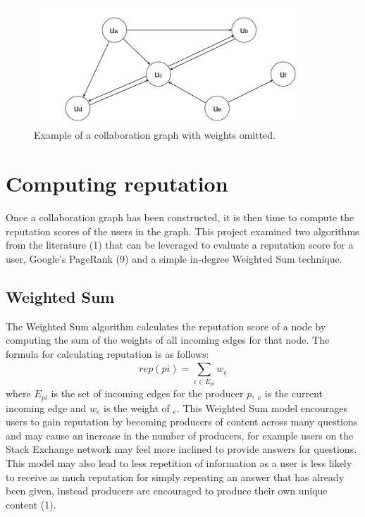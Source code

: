 \documentclass[]{final_report}
\begin{document}
\begin{figure}[ht!]
\centering
\includegraphics[width=100mm]{chap3/collabgraph.png}
\caption{Example of a collaboration graph with weights omitted.}
\label{gra:collabgraph}
\end{figure}

\section{Computing reputation}

Once a collaboration graph has been constructed, it is then time to compute the reputation scores of the users in the graph. This project examined two algorithms from the literature (1) that can be leveraged to evaluate a reputation score for a user, Google's PageRank (9) and a simple in-degree Weighted Sum technique.

\subsection{Weighted Sum}

The Weighted Sum algorithm calculates the reputation score of a node by computing the sum of the weights of all incoming edges for that node. The formula for calculating reputation is as follows:
\[
rep(pi) = \sum_{e\in E_{pi}}^{} w_{e} 
\]
where $E_{pi}$ is the set of incoming edges for the producer $p$, $_{e}$ is the current incoming edge and $w_{e}$ is the weight of $_{e}$. This Weighted Sum model encourages users to gain reputation by becoming producers of content across many questions and may cause an increase in the number of producers, for example users on the Stack Exchange network may feel more inclined to provide answers for questions. This model may also lead to less repetition of information as a user is less likely to receive as much reputation for simply repeating an answer that has already been given, instead producers are encouraged to produce their own unique content (1).

\end{document}

